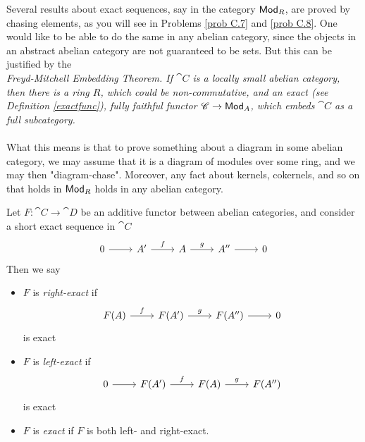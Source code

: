 \vspace*{0.1in}

\begin{discussion}
Several results about exact sequences, say in the category $\mathsf{Mod}_R$, are proved by chasing elements, as you will see in Problems \ref{prob C.7} and \ref{prob C.8}. One would like to be able to do the same in any abelian category, since the objects in an abstract abelian category are not guaranteed to be sets. But this can be justified by the\\[0.5em] \emph{Freyd-Mitchell Embedding Theorem. If $\cat{C}$ is a locally small abelian category, then there is a ring $R$, which could be non-commutative, and an exact (see Definition \ref{exactfunc}), fully faithful functor $\mathscr{C} \to \mathsf{Mod}_A$, which embeds $\cat{C}$ as a full subcategory.}\\
\\
What this means is that to prove something about a diagram in some abelian category, we may assume that it is a diagram of modules over some ring, and we may then "diagram-chase". Moreover, any fact about kernels, cokernels, and so on that holds in $\mathsf{Mod}_R$ holds in any abelian category.
\end{discussion}

\vspace*{0.1in}

\begin{definition}\label{exactfunc}
Let $F:\cat{C} \to \cat{D}$ be an additive functor between abelian categories, and consider a short exact sequence in $\cat{C}$
\[\begin{tikzcd}
0 \arrow[r] & A' \arrow[r,"f"] & A \arrow[r,"g"] & A'' \arrow[r] & 0
\end{tikzcd}\]
Then we say
\begin{itemize}
\item $F$ is \emph{right-exact} if
\[\begin{tikzcd}
F(A) \arrow[r,"f"] & F(A') \arrow[r,"g"] & F(A'') \arrow[r] & 0
\end{tikzcd}\]
is exact
\item $F$ is \emph{left-exact} if
\[\begin{tikzcd}
0 \arrow[r] & F(A') \arrow[r,"f"] & F(A) \arrow[r,"g"] & F(A'')
\end{tikzcd}\]
is exact
\item $F$ is \emph{exact} if $F$ is both left- and right-exact.
\end{itemize}
\end{definition}

